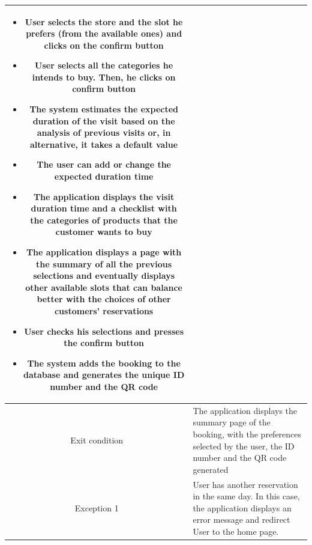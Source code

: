\documentclass[table, 12pt]{article}
\begin{document}
\begin{minipage}{\textwidth}
\begin{longtable}{|c| p{10cm}|}
\begin{itemize}[nosep,after=\strut]
            \item User selects the store and the slot he prefers (from the available ones) and clicks on the confirm button
            \item User selects all the categories he intends to buy. Then, he clicks on confirm button
            \item  The system estimates the expected duration of the visit based on the analysis of previous visits or, in alternative, it takes a default value
            \item The user can add or change the expected duration time
            \item The application displays the visit duration time and a checklist with the categories of products that the customer wants to buy
            \item The application displays a page with the summary of all the previous selections and eventually displays other available slots that can balance better with the choices of other customers' reservations
            \item User checks his selections and presses the confirm button
            \item The system adds the booking to the database and generates the unique ID number and the QR code
        \end{itemize}                                                                                                                   \\
        \hline
        Exit condition   & The application displays the summary page of the booking, with the preferences selected by the user, the ID number and the QR code generated
        \\
        \hline
        \hline
        Exception 1      & User has another reservation in the same day. In this case, the application displays an error message and redirect User to the home page.    \\
        \hline
    \end{longtable}


\end{minipage}
\end{document}
